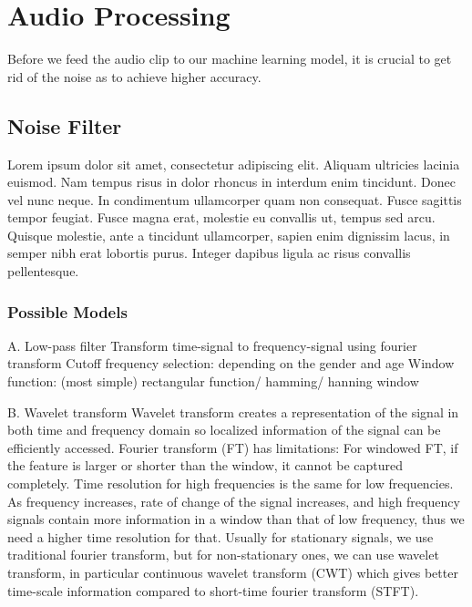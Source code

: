 
\chapter{Audio Processing} %

\label{Chapter5} %
Before we feed the audio clip to our machine learning model, it is crucial to get rid of the noise as to achieve higher accuracy.



\section{Noise Filter}

Lorem ipsum dolor sit amet, consectetur adipiscing elit. Aliquam ultricies lacinia euismod. Nam tempus risus in dolor rhoncus in interdum enim tincidunt. Donec vel nunc neque. In condimentum ullamcorper quam non consequat. Fusce sagittis tempor feugiat. Fusce magna erat, molestie eu convallis ut, tempus sed arcu. Quisque molestie, ante a tincidunt ullamcorper, sapien enim dignissim lacus, in semper nibh erat lobortis purus. Integer dapibus ligula ac risus convallis pellentesque.

\subsection{Possible Models}

A. Low-pass filter
Transform time-signal to frequency-signal using fourier transform
Cutoff frequency selection: depending on the gender and age
Window function: (most simple) rectangular function/ hamming/ hanning window

B. Wavelet transform
Wavelet transform creates a representation of the signal in both time and frequency domain so localized information of the signal can be efficiently accessed. Fourier transform (FT) has limitations: 
	For windowed FT, if the feature is larger or shorter than the window, it cannot be captured completely.
	Time resolution for high frequencies is the same for low frequencies. As frequency increases, rate of change of the signal increases, and high frequency signals contain more information in a window than that of low frequency, thus we need a higher time resolution for that.
Usually for stationary signals, we use traditional fourier transform, but for non-stationary ones, we can use wavelet transform, in particular continuous wavelet transform (CWT) which gives better time-scale information compared to short-time fourier transform (STFT). 
 
